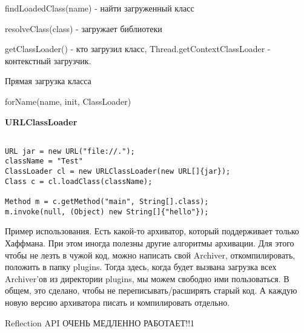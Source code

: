 \documentclass{article}
\begin{document}
findLoadedClass(name) - найти загруженный класс

resolveClass(class) - загружает библиотеки

getClassLoader() - кто загрузил класс, Thread.getContextClassLoader - контекстный загрузчик.

Прямая загрузка класса

forName(name, init, ClassLoader)

\textbf{URLClassLoader}

\begin{lstlisting}

URL jar = new URL("file://.");
className = "Test"
ClassLoader cl = new URLClassLoader(new URL[]{jar});
Class c = cl.loadClass(className);

Method m = c.getMethod("main", String[].class);
m.invoke(null, (Object) new String[]{"hello"});

\end{lstlisting}

Пример использования. Есть какой-то архиватор, который поддерживает только Хаффмана. При этом иногда полезны другие алгоритмы архивации. Для этого чтобы не лезть в чужой код, можно написать свой Archiver, откомпилировать, положить в папку plugins. Тогда здесь, когда будет вызвана загрузка всех Archiver'ов из директории plugins, мы можем свободно ими пользоваться. В общем, это сделано, чтобы не переписывать/расширять старый код. А каждую новую версию архиватора писать и компилировать отдельно.

Reflection API ОЧЕНЬ МЕДЛЕННО РАБОТАЕТ!!1
\end{document}
